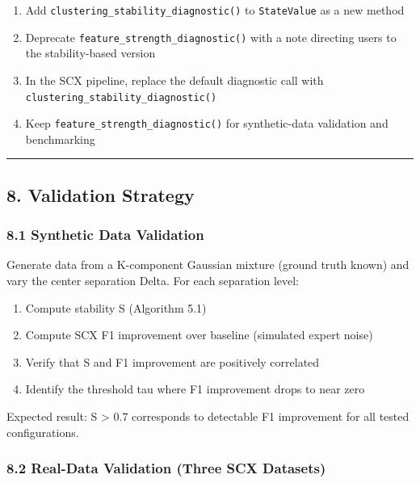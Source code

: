 \documentclass[
  12pt,
]{ctexart}
\providecommand{\tightlist}{%
  \setlength{\itemsep}{0pt}\setlength{\parskip}{0pt}}
\begin{document}
\begin{enumerate}
\def\labelenumi{\arabic{enumi}.}
\tightlist
\item
  Add \texttt{clustering\_stability\_diagnostic()} to
  \texttt{StateValue} as a new method
\item
  Deprecate \texttt{feature\_strength\_diagnostic()} with a note
  directing users to the stability-based version
\item
  In the SCX pipeline, replace the default diagnostic call with
  \texttt{clustering\_stability\_diagnostic()}
\item
  Keep \texttt{feature\_strength\_diagnostic()} for synthetic-data
  validation and benchmarking
\end{enumerate}

\begin{center}\rule{0.5\linewidth}{0.5pt}\end{center}

\subsection{8. Validation Strategy}\label{validation-strategy}

\subsubsection{8.1 Synthetic Data
Validation}\label{synthetic-data-validation}

Generate data from a K-component Gaussian mixture (ground truth known)
and vary the center separation Delta. For each separation level:

\begin{enumerate}
\def\labelenumi{\arabic{enumi}.}
\tightlist
\item
  Compute stability S (Algorithm 5.1)
\item
  Compute SCX F1 improvement over baseline (simulated expert noise)
\item
  Verify that S and F1 improvement are positively correlated
\item
  Identify the threshold tau where F1 improvement drops to near zero
\end{enumerate}

Expected result: S \textgreater{} 0.7 corresponds to detectable F1
improvement for all tested configurations.

\subsubsection{8.2 Real-Data Validation (Three SCX
Datasets)}\label{real-data-validation-three-scx-datasets}
\end{document}
